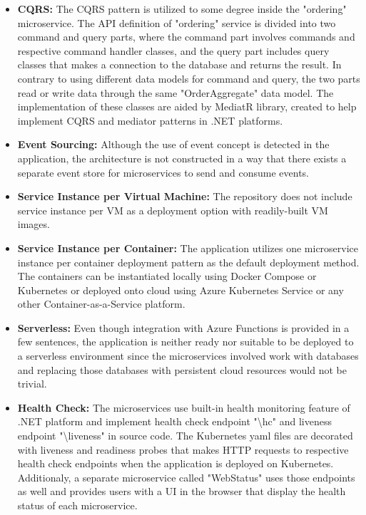 \documentclass{Configuration_Files/PoliMi3i_thesis}
\begin{document}
\begin{itemize}
    \item \textbf{CQRS:} The CQRS pattern is utilized to some degree inside the "ordering" microservice.
    The API definition of "ordering" service is divided into two command and query parts, where the command part involves commands and respective command handler classes, and the query part includes query classes that makes a connection to the database and returns the result.
    In contrary to using different data models for command and query, the two parts read or write data through the same "OrderAggregate" data model.
    The implementation of these classes are aided by MediatR\footnotemark[68] library, created to help implement CQRS and mediator patterns in .NET platforms.
    
    \item \textbf{Event Sourcing:} Although the use of event concept is detected in the application, the architecture is not constructed in a way that there exists a separate event store for microservices to send and consume events.
    
    \item \textbf{Service Instance per Virtual Machine:} The repository does not include service instance per VM as a deployment option with readily-built VM images.

    \item \textbf{Service Instance per Container:} The application utilizes one microservice instance per container deployment pattern as the default deployment method.
    The containers can be instantiated locally using Docker Compose or Kubernetes or deployed onto cloud using Azure Kubernetes Service or any other Container-as-a-Service platform.
    
    \item \textbf{Serverless:} Even though integration with Azure Functions is provided in a few sentences, the application is neither ready nor suitable to be deployed to a serverless environment since the microservices involved work with databases and replacing those databases with persistent cloud resources would not be trivial.
    
    \item \textbf{Health Check:} The microservices use built-in health monitoring feature of .NET platform and implement health check endpoint "\textbackslash hc" and liveness endpoint "\textbackslash liveness" in source code.
    The Kubernetes yaml files are decorated with liveness and readiness probes that makes HTTP requests to respective health check endpoints when the application is deployed on Kubernetes.
    Additionaly, a separate microservice called "WebStatus" uses those endpoints as well and provides users with a UI in the browser that display the health status of each microservice.
    

\end{itemize}
\end{document}
